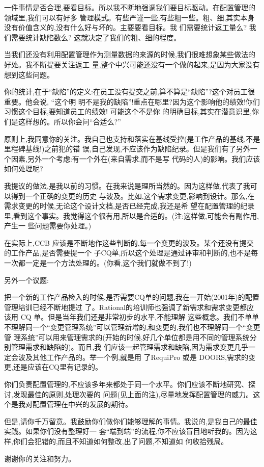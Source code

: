 \documentclass[11pt]{article}
\begin{document}
\begin{yang}
  \ylogo 一件事情是否合理,要看目标。所以我不断地强调我们要目标驱动。在配置管理的领域里,我们可以有好多
  管理模式。有些严谨一些,有些粗一些。粗、细,其实本身没有价值含义的,没有什么好与坏的。主要要看目标。我
  们需要统计返工量么? 我们需要统计缺陷数么? 这就决定了我们的粗、细的程度。

  当我们还没有利用配置管理作为测量数据的来源的时候,我们很难想象某些做法的好处。我不断提要关注返工
  量,整个中兴可能还没有一个做的起来,是因为大家没有想到这些问题。

  你的统计,在于``缺陷''的定义:在员工没有提交之前,算不算是``缺陷''?这个对员工很重要。他会说, ``这个明
  明不是我的缺陷''!重点在哪里?因为这个影响他的绩效!你们习惯这个目标,要知道员工的绩效! 可能这个不是你
  的明确目标,其实在潜意识里,你们是这样想的。所以你会问``合适么?''

  原则上,我同意你的关注。我自己也支持和落实在基线受控(是工作产品的基线,不是里程碑基线!)之前犯的错
  误,自己发现,不应该作为缺陷纪录。但是我们有了另外一个因素,另外一个考虑:有一个外在(来自需求,而不是写
  代码的人)的影响。我们应该如何处理呢?

  我提议的做法,是我以前的习惯。在我来说是理所当然的。因为这样做,代表了我可以得到一个正确的变更的历史
  与波及。比如,这个需求变更,影响到设计。那么,在需求变更的时候,无论这个设计文档,是否已经完成,我还是希
  望在配置管理的纪录里,看到这个事实。我觉得这个很有用,所以是合适的。(注:这样做,可能会有副作用,产生一
  些问题需要你处理。)

  在实际上,CCB 应该是不断地作这些判断的,每一个变更的波及。某个还没有提交的工作产品,是否需要提一个
  子CQ单,所以这个处理是通过评审和判断的,也不是每一次都一定是一个方法处理的。(你看,这个我们就做不到了!)

  另外一个议题:

  把一个新的工作产品检入的时候,是否需要CQ单的问题,我在一开始(2001年)的配置管理培训已经不断地提过
  了。Rational的培训师也强调了新需求和需求变更都应该用 CQ 单。但是当年我们还是非常初步的水平,不能理解
  这些概念。我们不单单不理解同一个``变更管理系统''可以管理新增的,和变更的,我们也不理解同一个``变更管
  理系统''可以用来管理需求的(开始的时候,好几个单位都是用不同的管理系统分别管理需求和缺陷的)。而且,我
  们应该一起管理需求和缺陷,因为需求变更几乎一定会波及其他工作产品的。举一个例,就是用
  了RequiPro 或是 DOORS,需求的变更,还是应该在CQ里有记录的。

  你们负责配置管理的,不应该多年来都处于同一个水平。你们应该不断地研究、探讨,发现最佳的原则,处理次要的
  问题(见上面的注),尽量地发挥配置管理的威力。这个是我对配置管理在中兴的发展的期待。

  但是,请你千万留意。我鼓励你们做你们能够理解的事情。我说的,是我自己的最佳实践。如果你们没有整理好一
  套``端到端''的流程,你不应该盲目地听我的。因为这样,你们会犯错的,而且不知道如何整改,出了问题,不知道如
  何收拾残局。

  谢谢你的关注和努力。
\end{yang}
\end{document}
